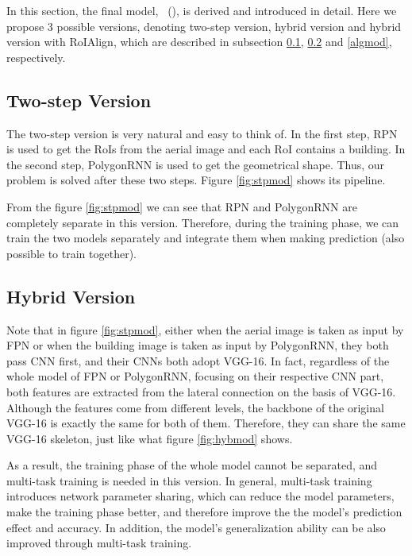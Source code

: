 In this section, the final model, \modelnameshort\ (\modelnamelong), is derived and introduced in detail. Here we propose 3 possible versions, denoting two-step version, hybrid version and hybrid version with RoIAlign, which are described in subsection \ref{stpmod}, \ref{hybmod} and \ref{algmod}, respectively.

\subsection{Two-step Version}\label{stpmod}

The two-step version is very natural and easy to think of. In the first step, RPN is used to get the RoIs from the aerial image and each RoI contains a building. In the second step, PolygonRNN is used to get the geometrical shape. Thus, our problem is solved after these two steps. Figure \ref{fig:stpmod} shows its pipeline.



From the figure \ref{fig:stpmod} we can see that RPN and PolygonRNN are completely separate in this version. Therefore, during the training phase, we can train the two models separately and integrate them when making prediction (also possible to train together).

\subsection{Hybrid Version}\label{hybmod}
Note that in figure \ref{fig:stpmod}, either when the aerial image is taken as input by FPN or when the building image is taken as input by PolygonRNN, they both pass CNN first, and their CNNs both adopt VGG-16. In fact, regardless of the whole model of FPN or PolygonRNN, focusing on their respective CNN part, both features are extracted from the lateral connection on the basis of VGG-16. Although the features come from different levels, the backbone of the original VGG-16 is exactly the same for both of them. Therefore, they can share the same VGG-16 skeleton, just like what figure \ref{fig:hybmod} shows.



As a result, the training phase of the whole model \modelnameshort cannot be separated, and multi-task training is needed in this version. In general, multi-task training introduces network parameter sharing, which can reduce the model parameters, make the training phase better, and therefore improve the the model's prediction effect and accuracy. In addition, the model's generalization ability can be also improved through multi-task training.


